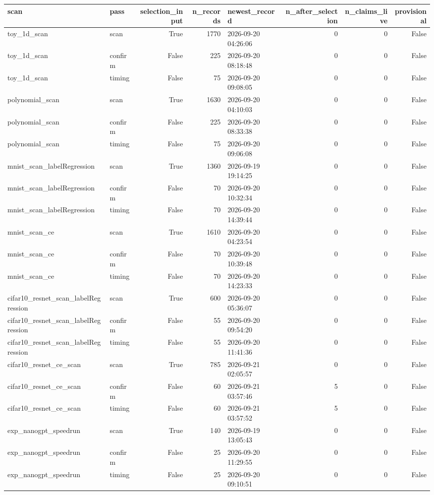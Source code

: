\begin{tabular}{llrrlrrr}
\toprule
scan & pass & selection\_input & n\_records & newest\_record & n\_after\_selection & n\_claims\_live & provisional \\
\midrule
toy\_1d\_scan & scan & True & 1770 & 2026-09-20 04:26:06 & 0 & 0 & False \\
toy\_1d\_scan & confirm & False & 225 & 2026-09-20 08:18:48 & 0 & 0 & False \\
toy\_1d\_scan & timing & False & 75 & 2026-09-20 09:08:05 & 0 & 0 & False \\
polynomial\_scan & scan & True & 1630 & 2026-09-20 04:10:03 & 0 & 0 & False \\
polynomial\_scan & confirm & False & 225 & 2026-09-20 08:33:38 & 0 & 0 & False \\
polynomial\_scan & timing & False & 75 & 2026-09-20 09:06:08 & 0 & 0 & False \\
mnist\_scan\_labelRegression & scan & True & 1360 & 2026-09-19 19:14:25 & 0 & 0 & False \\
mnist\_scan\_labelRegression & confirm & False & 70 & 2026-09-20 10:32:34 & 0 & 0 & False \\
mnist\_scan\_labelRegression & timing & False & 70 & 2026-09-20 14:39:44 & 0 & 0 & False \\
mnist\_scan\_ce & scan & True & 1610 & 2026-09-20 04:23:54 & 0 & 0 & False \\
mnist\_scan\_ce & confirm & False & 70 & 2026-09-20 10:39:48 & 0 & 0 & False \\
mnist\_scan\_ce & timing & False & 70 & 2026-09-20 14:23:33 & 0 & 0 & False \\
cifar10\_resnet\_scan\_labelRegression & scan & True & 600 & 2026-09-20 05:36:07 & 0 & 0 & False \\
cifar10\_resnet\_scan\_labelRegression & confirm & False & 55 & 2026-09-20 09:54:20 & 0 & 0 & False \\
cifar10\_resnet\_scan\_labelRegression & timing & False & 55 & 2026-09-20 11:41:36 & 0 & 0 & False \\
cifar10\_resnet\_ce\_scan & scan & True & 785 & 2026-09-21 02:05:57 & 0 & 0 & False \\
cifar10\_resnet\_ce\_scan & confirm & False & 60 & 2026-09-21 03:57:46 & 5 & 0 & False \\
cifar10\_resnet\_ce\_scan & timing & False & 60 & 2026-09-21 03:57:52 & 5 & 0 & False \\
exp\_nanogpt\_speedrun & scan & True & 140 & 2026-09-19 13:05:43 & 0 & 0 & False \\
exp\_nanogpt\_speedrun & confirm & False & 25 & 2026-09-20 11:29:55 & 0 & 0 & False \\
exp\_nanogpt\_speedrun & timing & False & 25 & 2026-09-20 09:10:51 & 0 & 0 & False \\
\bottomrule
\end{tabular}
